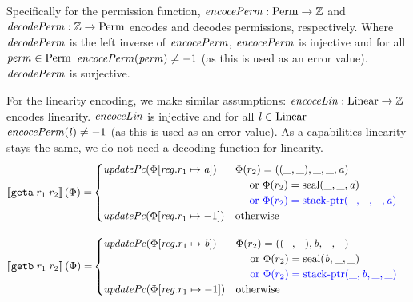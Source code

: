 \documentclass[a4paper]{article}
\begin{document}
Specifically for the permission function, $\encPerm{} : \Perm \fun \ints$ and $\decPerm{} : \ints \fun \Perm $ encodes and decodes permissions, respectively. Where $\decPerm{}$ is the left inverse of $\encPerm{}$, $\encPerm{}$ is injective and for all $\mathit{perm} \in \mathrm{Perm}$ $\encPerm{\perm} \neq -1$ (as this is used as an error value). $\decPerm{}$ is surjective.

For the linearity encoding, we make similar assumptions: $\encLin{} : \Linear \fun \ints$ encodes linearity. $\encLin{}$ is injective and for all $\mathit{l} \in \mathrm{Linear}$ $\encPerm{\lin} \neq -1$ (as this is used as an error value). As a capabilities linearity stays the same, we do not need a decoding function for linearity.
\begin{align*}
  \sem{\tgeta{r_1}{r_2}}(\Phi) = & 
                                   \begin{cases}
                                     \updPcAddr{\Phi\updReg{r_1}{\aaddr}} & 
                                     \arraycolsep=0pt
                                     \begin{array}[t]{l}
                                       \Phi(r_2) = ((\_,\_),\_,\_,\aaddr) \\
                                       \quad \tor \Phi(r_2) = \seal{\_,\_,\aaddr} \\ 
                                       \quad \src{\tor \Phi(r_2) = \stkptr{\_,\_,\_,\aaddr} } \\
                                     \end{array} \\
                                     \updPcAddr{\Phi\updReg{r_1}{-1}} & \totherwise
                                   \end{cases}
\end{align*}

\begin{align*}
  \sem{\tgetb{r_1}{r_2}}(\Phi) = & 
                                   \begin{cases}
                                     \updPcAddr{\Phi\updReg{r_1}{\baddr}} & 
                                     \arraycolsep=0pt
                                     \begin{array}[t]{l}
                                       \Phi(r_2) = ((\_,\_),\baddr,\_,\_) \\
                                       \quad \tor \Phi(r_2) = \seal{\baddr,\_,\_} \\
                                       \quad \src{\tor \Phi(r_2) = \stkptr{\_,\baddr,\_,\_} } \\
                                     \end{array} \\
                                     \updPcAddr{\Phi\updReg{r_1}{-1}} & \totherwise
                                   \end{cases}
\end{align*}
\end{document}
